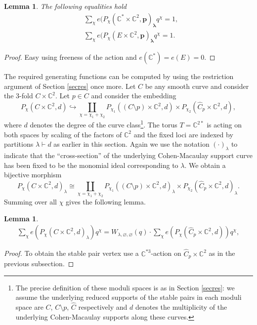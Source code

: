 \documentclass[12pt]{amsart}
\newtheorem{lemma}[theorem]{Lemma}
\theoremstyle{definition}
\theoremstyle{property}
\newcommand\p{\mathbf{p}}
\newcommand\bslambda{\boldsymbol{\lambda}}
\newcommand\C{\mathbb C}
\renewcommand\_{^{}_}
\begin{document}
\begin{lemma} \label{lem7}
The following equalities hold
\begin{align*}
&\sum_{\chi} e(P_{\chi}(\C^* \times \C^2,\p)_{\bslambda} q^{\chi} = 1, \\
&\sum_{\chi} e(P_{\chi}(E \times \C^2,\p)_{\bslambda} q^{\chi} = 1.
\end{align*}
\end{lemma} 
\begin{proof}
Easy using freeness of the action and $e(\C^*) = e(E) = 0$.
\end{proof}

The required generating functions can be computed by using the restriction argument of Section \ref{secres} once more. Let $C$ be any smooth curve and consider the 3-fold $C \times \C^2$. Let $p \in C$ and consider the embedding
$$
P_{\chi}(C \times \C^2, d) \hookrightarrow \coprod_{\chi = \chi_1 + \chi_2} P_{\chi_1}((C \setminus p) \times \C^2, d) \times P_{\chi_2}(\widehat{C}_p \times \C^2, d), 
$$
where $d$ denotes the degree of the curve class\footnote{The precise definition of these moduli spaces is as in Section \ref{secres}: we assume the underlying reduced supports of the stable pairs in each moduli space are $C$, $C \setminus p$, $\widehat{C}$ respectively and $d$ denotes the multiplicity of the underlying Cohen-Macaulay supports along these curves.}. The torus $T = \C^{2*}$ is acting on both spaces by scaling of the factors of $\C^2$ and the fixed loci are indexed by partitions $\lambda \vdash d$ as earlier in this section. Again we use the notation $(\cdot)_\lambda$ to indicate that the ``cross-section'' of the underlying Cohen-Macaulay support curve has been fixed to be the monomial ideal corresponding to $\lambda$. We obtain a bijective morphism
$$
P_{\chi}(C \times \C^2, d)_\lambda \cong \coprod_{\chi = \chi_1 + \chi_2} P_{\chi_1}((C \setminus p) \times \C^2, d)_\lambda \times P_{\chi_2}(\widehat{C}_p \times \C^2, d)_\lambda. 
$$
Summing over all $\chi$ gives the following lemma.
\begin{lemma} \label{lem8}
\begin{align*}
\sum_{\chi} e(P_{\chi}(C \times \C^2, d)_\lambda) q^{\chi} = W_{\lambda,\varnothing,\varnothing}(q) \cdot \sum_{\chi} e(P_{\chi}(\widehat{C}_p \times \C^2, d)) q^{\chi},
\end{align*}
\end{lemma}
\begin{proof}
To obtain the stable pair vertex use a $\C^{*3}$-action on $\widehat{C}_p \times \C^2$ as in the previous subsection.
\end{proof}
\end{document}

